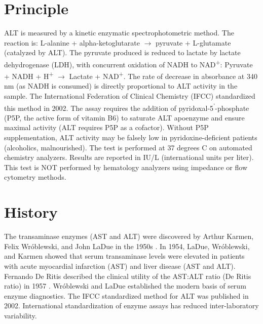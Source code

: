 \section*{Principle}
ALT is measured by a kinetic enzymatic spectrophotometric method. The reaction is: L-alanine + alpha-ketoglutarate $\rightarrow$ pyruvate + L-glutamate (catalyzed by ALT). The pyruvate produced is reduced to lactate by lactate dehydrogenase (LDH), with concurrent oxidation of NADH to NAD\textsuperscript{+}: Pyruvate + NADH + H\textsuperscript{+} $\rightarrow$ Lactate + NAD\textsuperscript{+}. The rate of decrease in absorbance at 340 nm (as NADH is consumed) is directly proportional to ALT activity in the sample. The International Federation of Clinical Chemistry (IFCC) standardized this method in 2002. The assay requires the addition of pyridoxal-5\textsuperscript{'}-phosphate (P5P, the active form of vitamin B6) to saturate ALT apoenzyme and ensure maximal activity (ALT requires P5P as a cofactor). Without P5P supplementation, ALT activity may be falsely low in pyridoxine-deficient patients (alcoholics, malnourished). The test is performed at 37 degrees C on automated chemistry analyzers. Results are reported in IU/L (international units per liter). This test is NOT performed by hematology analyzers using impedance or flow cytometry methods.

\section*{History}
The transaminase enzymes (AST and ALT) were discovered by Arthur Karmen, Felix Wr\'{o}blewski, and John LaDue in the 1950s \cite{karmen1955transaminase}. In 1954, LaDue, Wr\'{o}blewski, and Karmen showed that serum transaminase levels were elevated in patients with acute myocardial infarction (AST) and liver disease (AST and ALT). Fernando De Ritis described the clinical utility of the AST:ALT ratio (De Ritis ratio) in 1957 \cite{deritis1957enzymic}. Wr\'{o}blewski and LaDue established the modern basis of serum enzyme diagnostics. The IFCC standardized method for ALT was published in 2002. International standardization of enzyme assays has reduced inter-laboratory variability.

